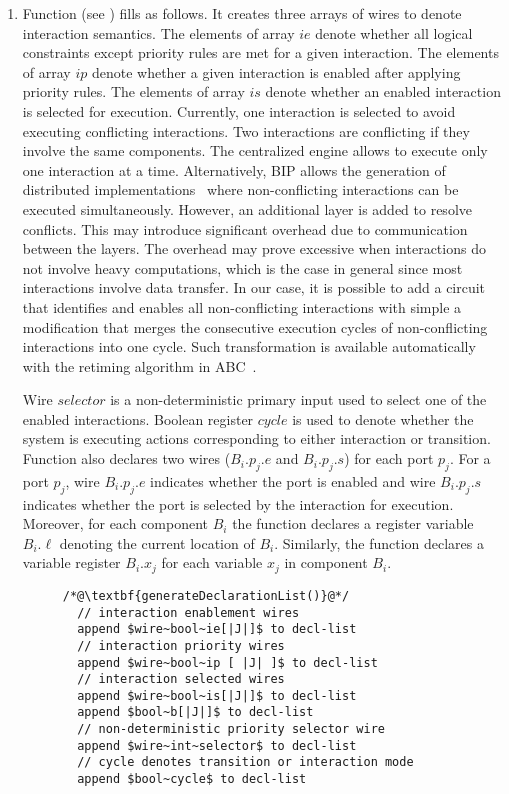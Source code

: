 \begin{enumerate}
\item Function  (see ) fills  as follows. 
It creates three arrays of wires to denote interaction semantics. 
The elements of array $\mathit{ie}$ denote whether all logical constraints except priority rules are met for a given interaction. 
The elements of array $\mathit{ip}$ denote whether a given interaction is enabled after applying priority rules. 
The elements of array $\mathit{is}$ denote whether an enabled interaction is selected for execution. 
Currently, one interaction is selected to avoid executing conflicting interactions. 
Two interactions are conflicting if they involve the same components. 
The centralized engine allows to execute only one interaction at a time. 
Alternatively, BIP allows the generation of distributed implementations~\cite{BonakdarpourBJQS12} 
where non-conflicting interactions can be executed simultaneously.
However, an additional layer is added to resolve conflicts. 
This may introduce significant overhead due to communication between the layers. 
%
The overhead may prove excessive when 
interactions do not involve heavy computations, which is the case in general since most interactions involve data transfer.
In our case, it is possible to add a circuit that identifies and enables all non-conflicting interactions with simple a modification
that merges the consecutive execution cycles of non-conflicting interactions into one cycle. 
Such transformation is available automatically with the retiming algorithm in ABC~\cite{hurst2007fast}.


Wire $\mathit{selector}$ is a non-deterministic primary input used to select one of the enabled interactions.
Boolean register $\mathit{cycle}$ is used to denote whether the system is executing actions corresponding to either interaction or transition. 
Function  also declares two wires ($B_i.p_j.e$ and $B_i.p_j.s$) for each port $p_j$. 
For a port $p_j$, wire $B_i.p_j.e$ indicates whether the port is enabled and wire $B_i.p_j.s$ indicates whether the port is selected by the interaction for execution. 
Moreover, for each component $B_i$ the function declares a register variable $B_i.\ell$ denoting the current location of $B_i$. 
Similarly, the function declares a variable register $B_i.x_j$ for each variable $x_j$ in component $B_i$.  

\begin{figure}
\begin{lstlisting}
/*@\textbf{generateDeclarationList()}@*/
  // interaction enablement wires
  append $wire~bool~ie[|J|]$ to decl-list
  // interaction priority wires
  append $wire~bool~ip [ |J| ]$ to decl-list 
  // interaction selected wires
  append $wire~bool~is[|J|]$ to decl-list 
  append $bool~b[|J|]$ to decl-list 
  // non-deterministic priority selector wire
  append $wire~int~selector$ to decl-list 
  // cycle denotes transition or interaction mode
  append $bool~cycle$ to decl-list  


\end{lstlisting}
\end{figure}
\end{enumerate}
